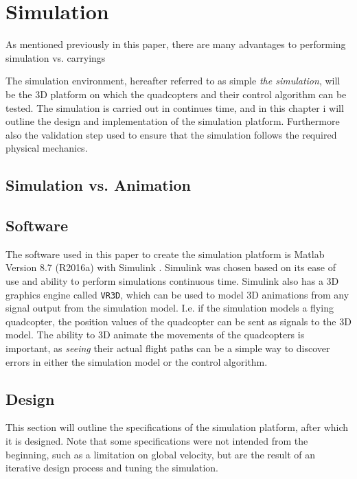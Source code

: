 
\chapter{Simulation}
\label{chap:simulation}
As mentioned previously in this paper, there are many advantages to performing simulation vs. carryings 


The simulation environment, hereafter referred to as simple \textit{the simulation}, will be the 3D platform on which the quadcopters and their control algorithm can be tested. The simulation is carried out in continues time, and in this chapter i will outline the design and implementation of the simulation platform. Furthermore also the validation step used to ensure that the simulation follows the required physical mechanics. 

\section{Simulation vs. Animation}
\label{sec:simulation_animation}


\section{Software}
The software used in this paper to create the simulation platform is Matlab Version 8.7 (R2016a) with Simulink \cite{_matlab_2016}. Simulink was chosen based on its ease of use and ability to perform simulations continuous time. Simulink also has a 3D graphics engine called \texttt{VR3D}\cite{_matlab_2016}, which can be used to model 3D animations from any signal output from the simulation model. I.e. if the simulation models a flying quadcopter, the position values of the quadcopter can be sent as signals to the 3D model. The ability to 3D animate the movements of the quadcopters is important, as \textit{seeing} their actual flight paths can be a simple way to discover errors in either the simulation model or the control algorithm. 

\section{Design}
\label{sec:design}
This section will outline the specifications of the simulation platform, after which it is designed. Note that some specifications were not intended from the beginning, such as a limitation on global velocity, but are the result of an iterative design process and tuning the simulation. 


